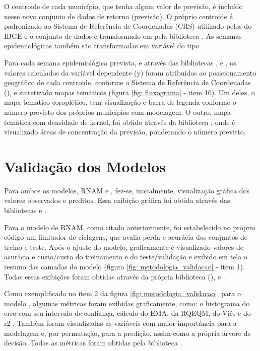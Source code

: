 \indent O centroide de cada município, que tenha algum valor de previsão, é incluído nesse novo conjunto de dados de retorno (previsão). O próprio centroide é padronizado ao Sistema de Referência de Coordenadas (\acrfull{CRS}) utilizado pelos  do \acrshort{IBGE} e o conjunto  de dados é transformado em  pela biblioteca . As semanas epidemiológicas também são transformadas em variável do tipo .

\indent Para cada semana epidemiológica prevista, e através das bibliotecas ,  e , os valores calculados da variável dependente (y) foram atribuídos ao posicionamento geográfico de cada centroide, conforme o Sistema de Referência de Coordenadas (), e sintetizado mapas temáticos (figura \ref{fig: fluxograma} - item 10). Um deles, o mapa temático coroplético, tem visualização e barra de legenda conforme o número previsto dos próprios municípios com modelagem. O outro, mapa temática com densidade de kernel, foi obtido através da biblioteca , onde é visualizado áreas de concentração da previsão, ponderando o número previsto.

\section{Validação dos Modelos}

\indent Para ambos os modelos, \acrshort{RNAM} e , fez-se, inicialmente, visualização gráfica dos valores observados e preditos. Essa exibição gráfica foi obtida através das bibliotecas  e .

\indent Para o modelo de \acrshort{RNAM}, como citado anteriormente, foi estabelecido no próprio código um limitador de ciclagens, que avalia perda e acurácia dos conjuntos de treino e teste. Após o ajuste do modelo, graficamente é visualizado valores de acurácia e custo/custo do treinamento e do teste/validação e exibido em tela o resumo das camadas do modelo (figura \ref{fig: metodologia_validacao} - item 1). Todas essas exibições foram obtidas através da própria biblioteca (),  e .

\indent Como exemplificado no item 2 da figura \ref{fig: metodologia_validacao}, para o modelo , algumas métricas foram exibidas graficamente, como: o histograma do erro com seu intervalo de confiança, cálculo do \acrfull{EMA}, da \acrfull{RQEQM}, do Viés e do \acrfull{r2} \cite{StatsBook, scikit-learn_2011_pedregosa}. Também foram visualizadas as variáveis com maior importância para a modelagem e, por permutação, para a predição, assim como a própria árvore de decisão. Todas as métricas foram obtidas pela biblioteca .

